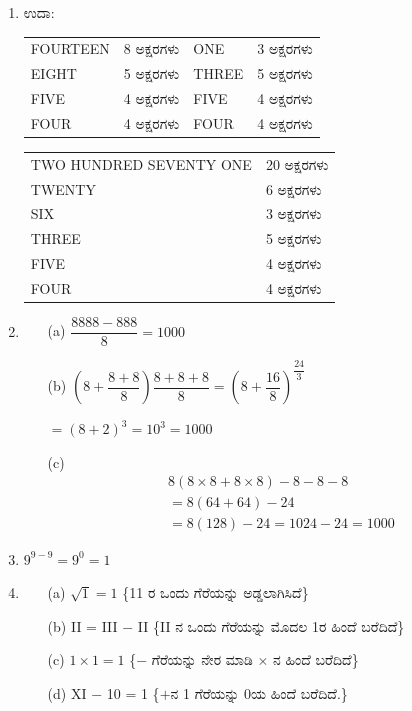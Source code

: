 \begin{enumerate}
\item ಉದಾ: 

\begin{tabular}[t]{llll}
FOURTEEN & 8 ಅಕ್ಷರಗಳು & ONE & 3 ಅಕ್ಷರಗಳು\\
EIGHT & 5 ಅಕ್ಷರಗಳು  & THREE & 5 ಅಕ್ಷರಗಳು\\
FIVE & 4 ಅಕ್ಷರಗಳು  & FIVE & 4 ಅಕ್ಷರಗಳು\\
FOUR & 4 ಅಕ್ಷರಗಳು  & FOUR & 4 ಅಕ್ಷರಗಳು
\end{tabular}

\vskip 0.2cm

\begin{tabular}[t]{ll}
TWO HUNDRED SEVENTY ONE & 20 ಅಕ್ಷರಗಳು\\
TWENTY & 6 ಅಕ್ಷರಗಳು\\
SIX & 3 ಅಕ್ಷರಗಳು\\
THREE & 5 ಅಕ್ಷರಗಳು\\
FIVE & 4 ಅಕ್ಷರಗಳು\\
FOUR & 4 ಅಕ್ಷರಗಳು
\end{tabular}

\smallskip
\item 
\begin{itemize}
\item[(a)] $\dfrac{8888 - 888}{8} = 1000$
\item[(b)] $\left(8 + \dfrac{8 + 8}{8}\right) \dfrac{8+8+8}{8} = \left(8 + \dfrac{16}{8}\right)^{\dfrac{24}{3}}$

\smallskip

$= (8 + 2)^{3} = 10^{3} = 1000$
\item[(c)] 
\begin{align*}
& 8(8\times 8 + 8\times 8) - 8 - 8 - 8\\
& = 8(64 + 64) - 24\\
& = 8(128) - 24 = 1024 - 24 = 1000
\end{align*}
\end{itemize}

\item $9^{9-9} = 9^{0} = 1$

\item 
\begin{itemize}
\item[(a)] $\sqrt{1} = 1$ \{11 ರ ಒಂದು ಗೆರೆಯನ್ನು ಅಡ್ಡಲಾಗಿಸಿದೆ\}
\item[(b)] II = III $-$ II \{II ನ ಒಂದು ಗೆರೆಯನ್ನು ಮೊದಲ 1ರ ಹಿಂದೆ ಬರೆದಿದೆ\}
\item[(c)] $1\times 1 = 1$ \{$-$ ಗೆರೆಯನ್ನು ನೇರ ಮಾಡಿ $\times$ ನ ಹಿಂದೆ ಬರೆದಿದೆ\}
\item[(d)] XI $-$ 10 = 1 \{$+$ನ 1 ಗೆರೆಯನ್ನು 0ಯ ಹಿಂದೆ ಬರೆದಿದೆ.\}
\end{itemize}


\end{enumerate}
